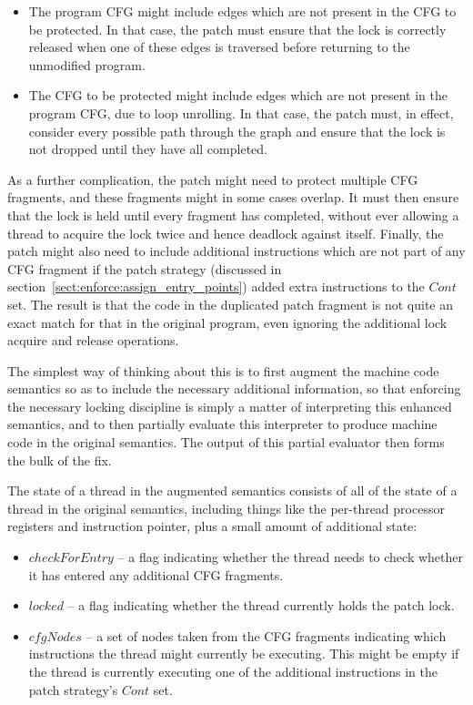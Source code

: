 \begin{itemize}
\item
  The program CFG might include edges which are not present in the CFG
  to be protected.  In that case, the patch must ensure that the lock
  is correctly released when one of these edges is traversed before
  returning to the unmodified program.
\item
  The CFG to be protected might include edges which are not present in
  the program CFG, due to loop unrolling.  In that case, the patch
  must, in effect, consider every possible path through the graph and
  ensure that the lock is not dropped until they have all completed.
\end{itemize}

As a further complication, the patch might need to protect multiple
CFG fragments, and these fragments might in some cases overlap.  It
must then ensure that the lock is held until every fragment has
completed, without ever allowing a thread to acquire the lock twice
and hence deadlock against itself.  Finally, the patch might also need
to include additional instructions which are not part of any CFG
fragment if the patch strategy (discussed in
section~\ref{sect:enforce:assign_entry_points}) added extra
instructions to the $Cont$ set.  The result is that the code in the
duplicated patch fragment is not quite an exact match for that in the
original program, even ignoring the additional lock acquire and
release operations.

The simplest way of thinking about this is to first augment the
machine code semantics so as to include the necessary additional
information, so that enforcing the necessary locking discipline is
simply a matter of interpreting this enhanced semantics, and to then
partially evaluate this interpreter to produce machine code in the
original semantics.  The output of this partial evaluator then forms
the bulk of the fix.

The state of a thread in the augmented semantics consists of all of
the state of a thread in the original semantics, including things like
the per-thread processor registers and instruction pointer, plus a
small amount of additional state:

\begin{itemize}
\item $checkForEntry$ -- a flag indicating whether the thread needs to
  check whether it has entered any additional CFG fragments.
\item $locked$ -- a flag indicating whether the thread currently holds
  the patch lock.
\item $cfgNodes$ -- a set of nodes taken from the CFG fragments
  indicating which instructions the thread might currently be
  executing.  This might be empty if the thread is currently executing
  one of the additional instructions in the patch strategy's $Cont$
  set.
\end{itemize}

